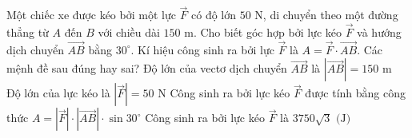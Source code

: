 

\begin{ex}%
	Một chiếc xe được kéo bởi một lực $\overrightarrow{F}$ có độ lớn $50 \text{ N}$, di chuyển theo một đường thẳng từ $A$ đến $B$ với chiều dài $150 \text{ m}$. Cho biết góc hợp bởi lực kéo $\overrightarrow{F}$ và hướng dịch chuyển $\overrightarrow{AB}$ bằng $30^\circ$. Kí hiệu công sinh ra bởi lực $\overrightarrow{F}$ là $A = \overrightarrow{F} \cdot \overrightarrow{AB}$. Các mệnh đề sau đúng hay sai?
	\choiceTF
	{\True Độ lớn của vectơ dịch chuyển $\overrightarrow{AB}$ là $|\overrightarrow{AB}| = 150 \text{ m}$}
	{\True Độ lớn của lực kéo là $|\overrightarrow{F}| = 50 \text{ N}$}
	{Công sinh ra bởi lực kéo $\overrightarrow{F}$ được tính bằng công thức $A = |\overrightarrow{F}| \cdot |\overrightarrow{AB}| \cdot \sin 30^\circ$}
	{\True Công sinh ra bởi lực kéo $\overrightarrow{F}$ là $3750\sqrt{3} \text{ (J)}$}
\end{ex}

